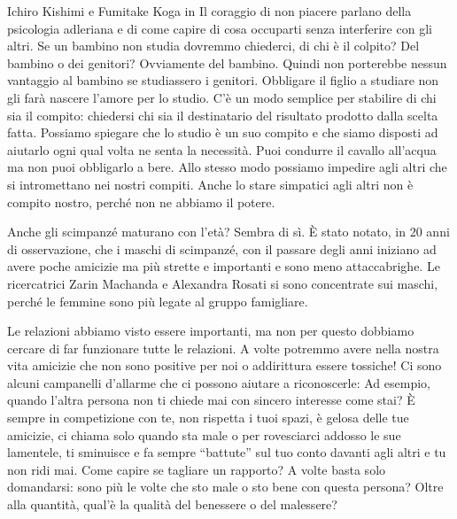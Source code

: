 \documentclass[12pt]{book} %
\begin{document}
\bigskip

Ichiro Kishimi e Fumitake Koga in Il coraggio di non piacere parlano
della psicologia adleriana e di come capire di cosa occuparti senza interferire con gli altri. Se un bambino non studia
dovremmo chiederci, di chi è il colpito? Del bambino o dei genitori? Ovviamente del bambino. Quindi non porterebbe
nessun vantaggio al bambino se studiassero i genitori. Obbligare il figlio a studiare non gli farà nascere l'amore per
lo studio. C'è un modo semplice per stabilire di chi sia il compito: chiedersi chi sia il
destinatario del risultato prodotto dalla scelta fatta. Possiamo spiegare che lo studio è un suo compito e che siamo
disposti ad aiutarlo ogni qual volta ne senta la necessità.
\newline
\newline
Puoi condurre il cavallo all'acqua ma non puoi obbligarlo a bere.
\newline
\newline
Allo stesso modo possiamo impedire agli altri che si intromettano nei nostri compiti. Anche lo stare simpatici agli
altri non è compito nostro, perché non ne abbiamo il potere.


\bigskip
\begin{mdframed}[linewidth=1pt]
Anche gli scimpanzé {\textquotedbl}maturano{\textquotedbl} con l'età? Sembra di sì. È stato notato, in 20 anni di
osservazione, che i maschi di scimpanzé, con il passare degli anni iniziano ad avere poche amicizie ma più strette e
importanti e sono meno attaccabrighe. Le ricercatrici Zarin Machanda e Alexandra Rosati si sono concentrate sui maschi,
perché le femmine sono più legate al gruppo famigliare. 
\end{mdframed}

\bigskip

Le relazioni abbiamo visto essere importanti, ma non per questo dobbiamo cercare di far funzionare tutte le relazioni. A
volte potremmo avere nella nostra vita amicizie che non sono positive per noi o addirittura essere tossiche! Ci sono
alcuni campanelli d'allarme che ci possono aiutare a riconoscerle: Ad esempio, quando
l'altra persona non ti chiede mai con sincero interesse come stai? È sempre in competizione con
te, non rispetta i tuoi spazi, è gelosa delle tue amicizie, ci chiama solo quando sta male o per rovesciarci addosso le
sue lamentele, ti sminuisce e fa sempre “battute” sul tuo conto davanti agli altri e tu non ridi
mai.
Come capire se tagliare un rapporto? A volte basta solo domandarsi: sono più le volte che sto male o sto bene con questa persona? Oltre alla quantità, qual'è la qualità del benessere o del malessere?
\end{document}

